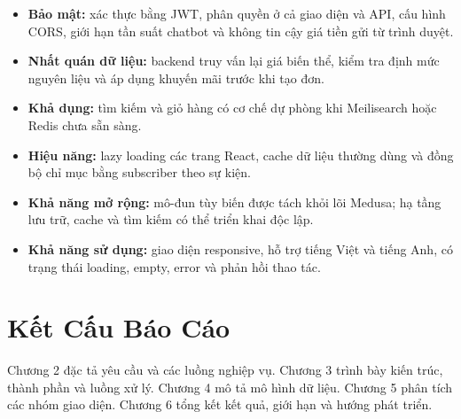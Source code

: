 \begin{itemize}[leftmargin=2em, itemsep=4pt]
  \item \textbf{Bảo mật:} xác thực bằng JWT, phân quyền ở cả giao diện và API, cấu hình CORS, giới hạn tần suất chatbot và không tin cậy giá tiền gửi từ trình duyệt.
  \item \textbf{Nhất quán dữ liệu:} backend truy vấn lại giá biến thể, kiểm tra định mức nguyên liệu và áp dụng khuyến mãi trước khi tạo đơn.
  \item \textbf{Khả dụng:} tìm kiếm và giỏ hàng có cơ chế dự phòng khi Meilisearch hoặc Redis chưa sẵn sàng.
  \item \textbf{Hiệu năng:} lazy loading các trang React, cache dữ liệu thường dùng và đồng bộ chỉ mục bằng subscriber theo sự kiện.
  \item \textbf{Khả năng mở rộng:} mô-đun tùy biến được tách khỏi lõi Medusa; hạ tầng lưu trữ, cache và tìm kiếm có thể triển khai độc lập.
  \item \textbf{Khả năng sử dụng:} giao diện responsive, hỗ trợ tiếng Việt và tiếng Anh, có trạng thái loading, empty, error và phản hồi thao tác.
\end{itemize}

\section{Kết Cấu Báo Cáo}

Chương 2 đặc tả yêu cầu và các luồng nghiệp vụ. Chương 3 trình bày kiến trúc, thành phần và luồng xử lý. Chương 4 mô tả mô hình dữ liệu. Chương 5 phân tích các nhóm giao diện. Chương 6 tổng kết kết quả, giới hạn và hướng phát triển.
